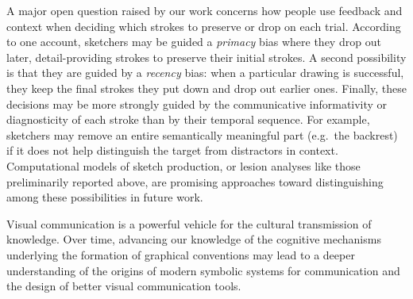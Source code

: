 \documentclass[10pt,letterpaper]{article}
\newcommand{\ndg}[1]{{\textcolor{Green}{[ndg: #1]}}}
\newcommand{\rdh}[1]{\textcolor{Red}{rdh: #1}}
\begin{document}
A major open question raised by our work concerns how people use feedback and context when deciding which strokes to preserve or drop on each trial.
According to one account, sketchers may be guided a \emph{primacy} bias where they drop out later, detail-providing strokes to preserve their initial strokes.
A second possibility is that they are guided by a \emph{recency} bias: when a particular drawing is successful, they keep the final strokes they put down and drop out earlier ones.
Finally, these decisions may be more strongly guided by the communicative informativity or diagnosticity of each stroke than by their temporal sequence.
For example, sketchers may remove an entire semantically meaningful part (e.g.~the backrest) if it does not help distinguish the target from distractors in context. %
Computational models of sketch production, or lesion analyses like those preliminarily reported above, are promising approaches toward distinguishing among these possibilities in future work. %

Visual communication is a powerful vehicle for the cultural transmission of knowledge.
Over time, advancing our knowledge of the cognitive mechanisms underlying the formation of graphical conventions
may lead to a deeper understanding of the origins of modern symbolic systems for communication and the design of better visual communication tools.
\end{document}
